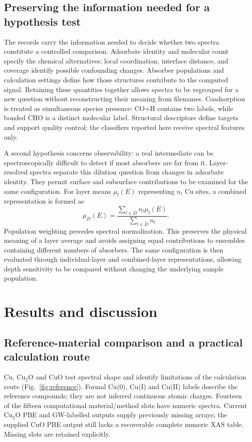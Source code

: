 \documentclass[11pt,a4paper]{article}
\begin{document}
\subsection{Preserving the information needed for a hypothesis test}
The records carry the information needed to decide whether two spectra constitute a controlled comparison. Adsorbate identity and molecular count specify the chemical alternatives; local coordination, interface distance, and coverage identify possible confounding changes. Absorber populations and calculation settings define how those structures contribute to the computed signal. Retaining these quantities together allows spectra to be regrouped for a new question without reconstructing their meaning from filenames. Coadsorption is treated as simultaneous species presence: CO+H contains two labels, while bonded CHO is a distinct molecular label. Structural descriptors define targets and support quality control; the classifiers reported here receive spectral features only.

A second hypothesis concerns observability: a real intermediate can be spectroscopically difficult to detect if most absorbers are far from it. Layer-resolved spectra separate this dilution question from changes in adsorbate identity. They permit surface and subsurface contributions to be examined for the same configuration. For layer means $\mu_l(E)$ representing $n_l$ Cu sites, a combined representation is formed as
\begin{equation}
\mu_D(E)=\frac{\sum_{l\in D}n_l\mu_l(E)}{\sum_{l\in D}n_l}.
\label{eq:average}
\end{equation}
Population weighting precedes spectral normalization. This preserves the physical meaning of a layer average and avoids assigning equal contributions to ensembles containing different numbers of absorbers. The same configuration is then evaluated through individual-layer and combined-layer representations, allowing depth sensitivity to be compared without changing the underlying sample population.


\section{Results and discussion}
\subsection{Reference-material comparison and a practical calculation route}
Cu, Cu$_2$O and CuO test spectral shape and identify limitations of the calculation route (Fig.~\ref{fig:reference}). Formal Cu(0), Cu(I) and Cu(II) labels describe the reference compounds; they are not inferred continuous atomic charges. Fourteen of the fifteen computational material/method slots have numeric spectra. Current Cu$_2$O PBE and GW-labelled outputs supply previously missing arrays; the supplied CuO PBE output still lacks a recoverable complete numeric XAS table. Missing slots are retained explicitly.
\end{document}
